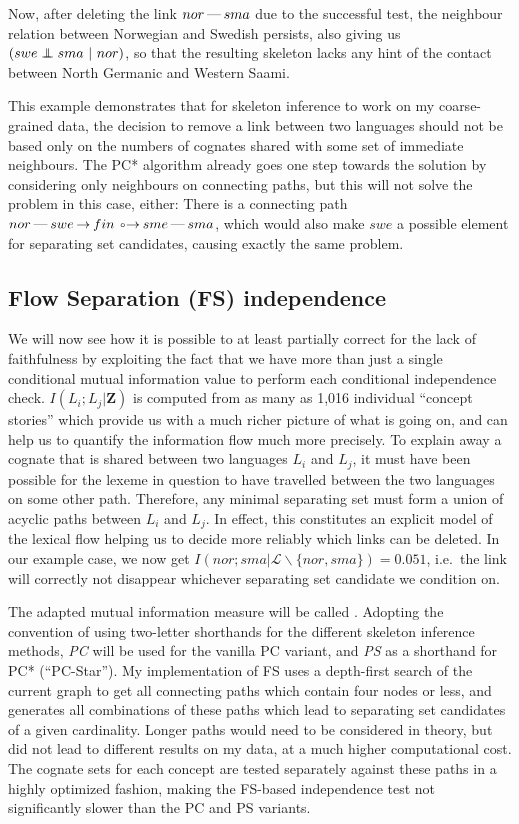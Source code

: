 Now, after deleting the link $nor \arrowLL sma$ due to the successful test, the neighbour relation between Norwegian and Swedish persists, also giving us $(swe \indep sma\ |\ nor)$, so that the resulting skeleton lacks any hint of the contact between North Germanic and Western Saami.

This example demonstrates that for skeleton inference to work on my coarse-grained data, the decision to remove a link between two languages should not be based only on the numbers of cognates shared with some set of immediate neighbours. The PC* algorithm already goes one step towards the solution by considering only neighbours on connecting paths, but this will not solve the problem in this case, either: There is a connecting path $nor \arrowLL swe \arrowLA fin \arrowOA sme \arrowLL sma$, which would also make $swe$ a possible element for separating set candidates, causing exactly the same problem.

\subsection{Flow Separation (FS) independence}
We will now see how it is possible to at least partially correct for the lack of faithfulness by exploiting the fact that we have more than just a single conditional mutual information value to perform each conditional independence check. $I(L_i;L_j|\mathbf{Z})$ is computed from as many as 1,016 individual ``concept stories'' which provide us with a much richer picture of what is going on, and can help us to quantify the information flow much more precisely. To explain away a cognate that is shared between two languages $L_i$ and $L_j$, it must have been possible for the lexeme in question to have travelled between the two languages on some other path. Therefore, any minimal separating set must form a union of acyclic paths between $L_i$ and $L_j$. In effect, this constitutes an explicit model of the lexical flow helping us to decide more reliably which links can be deleted. In our example case, we now get $I(nor;sma|\mathcal{L}\backslash\{nor,sma\}) = 0.051$, i.e.\ the link will correctly not disappear whichever 
separating set candidate we condition on.

The adapted mutual information measure will be called \textit{}. Adopting the convention of using two-letter shorthands for the different skeleton inference methods, \textit{PC} will be used for the vanilla PC variant, and \textit{PS} as a shorthand for PC* (``PC-Star''). My implementation of FS uses a depth-first search of the current graph to get all connecting paths which contain four nodes or less, and generates all combinations of these paths which lead to separating set candidates of a given cardinality. Longer paths would need to be considered in theory, but did not lead to different results on my data, at a much higher computational cost. The cognate sets for each concept are tested separately against these paths in a highly optimized fashion, making the FS-based independence test not significantly slower than the PC and PS variants.

